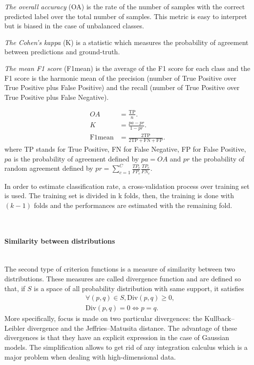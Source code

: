 \documentclass[journal,peerreview,onecolumn]{IEEEtran}
\begin{document}
            \emph{The overall accuracy} (OA) is the rate of the number of samples with the correct predicted label over the total number of samples. This metric is easy to interpret but is biased in the case of unbalanced classes.

            \emph{The Cohen's kappa} (K) is a statistic which measures the probability of agreement between predictions and ground-truth.

            \emph{The mean F1 score} (F1mean) is the average of the F1 score for each class and the F1 score is the harmonic mean of the precision (number of True Positive over True Positive plus False Positive) and the recall (number of True Positive over True Positive plus False Negative).

            \begin{align}
                OA &= \frac{\text{TP}}{n}. \\
                K &= \frac{pa - pr}{1 - pr}.  \\
                \text{F1mean} &= \frac{2 \text{TP}}{2 \text{TP} + \text{FN} + \text{FP}}.
            \end{align}
            where TP stands for True Positive, FN for False Negative, FP for False Positive, $pa$ is the probability of agreement defined by $pa = OA$  and $pr$ the probability of random agreement defined by $pr = \sum_{c=1}^{C} \frac{TP_c}{FP_c} \frac{TP_c}{FN_c}$.

            In order to estimate classification rate, a cross-validation process over training set is used\cite{opac-b1127878}. The training set is divided in k folds, then, the training is done with $(k-1)$ folds and the performances are estimated with the remaining fold.

            \hspace{0pt} \\

            \paragraph{Similarity between distributions}

            \hspace{0pt} \\
            The second type of criterion functions is a measure of similarity between two distributions. These measures are called divergence function and are defined so that, if $S$ is a space of all probability distribution with same support, it satisfies
            \begin{align*}
                &\forall (p,q) \in S, \text{Div}(p,q) \geq 0, \\
                &\text{Div}(p,q) = 0 \Leftrightarrow p = q.
            \end{align*}
            More specifically, focus is made on two particular divergences: the Kullback–Leibler divergence and the Jeffries–Matusita distance. The advantage of these divergences is that they have an explicit expression in the case of Gaussian models. The simplification allows to get rid of any integration calculus which is a major problem when dealing with high-dimensional data.
\end{document}
